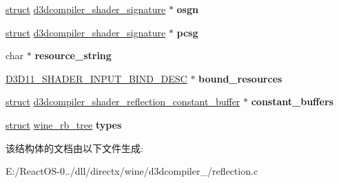 \begin{DoxyCompactItemize}
\mbox{\label{structd3dcompiler__shader__reflection_a164fcb19658de255198068b7740c53e2}} 
\hyperlink{interfacestruct}{struct} \hyperlink{structd3dcompiler__shader__signature}{d3dcompiler\+\_\+shader\+\_\+signature} $\ast$ {\bfseries osgn}
\item 
\mbox{\label{structd3dcompiler__shader__reflection_a27e2104200f5b1a55f2d5adc4e45d0de}} 
\hyperlink{interfacestruct}{struct} \hyperlink{structd3dcompiler__shader__signature}{d3dcompiler\+\_\+shader\+\_\+signature} $\ast$ {\bfseries pcsg}
\item 
\mbox{\label{structd3dcompiler__shader__reflection_acfb724cdd785be6d5621b3df63f77397}} 
char $\ast$ {\bfseries resource\+\_\+string}
\item 
\mbox{\label{structd3dcompiler__shader__reflection_ad59b654fd821de9fdf2e983adc58d3c9}} 
\hyperlink{struct___d3_d11___s_h_a_d_e_r___i_n_p_u_t___b_i_n_d___d_e_s_c}{D3\+D11\+\_\+\+S\+H\+A\+D\+E\+R\+\_\+\+I\+N\+P\+U\+T\+\_\+\+B\+I\+N\+D\+\_\+\+D\+E\+SC} $\ast$ {\bfseries bound\+\_\+resources}
\item 
\mbox{\label{structd3dcompiler__shader__reflection_a9ea9efc2776d6ab0d4d978192a8c7625}} 
\hyperlink{interfacestruct}{struct} \hyperlink{structd3dcompiler__shader__reflection__constant__buffer}{d3dcompiler\+\_\+shader\+\_\+reflection\+\_\+constant\+\_\+buffer} $\ast$ {\bfseries constant\+\_\+buffers}
\item 
\mbox{\label{structd3dcompiler__shader__reflection_aee7ff368d3eaeef0205c3ee7f5c61451}} 
\hyperlink{interfacestruct}{struct} \hyperlink{structwine__rb__tree}{wine\+\_\+rb\+\_\+tree} {\bfseries types}
\end{DoxyCompactItemize}


该结构体的文档由以下文件生成\+:\begin{DoxyCompactItemize}
\item 
E\+:/\+React\+O\+S-\/0../dll/directx/wine/d3dcompiler\+\_/reflection.\+c\end{DoxyCompactItemize}
